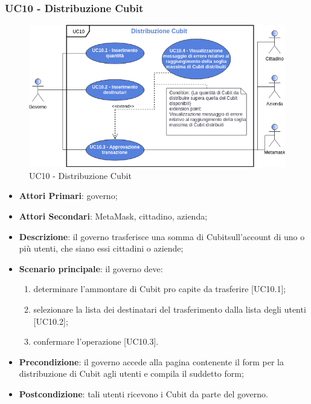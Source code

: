 \subsubsection{UC10 - Distribuzione Cubit}
\begin{figure}[h]
	\includegraphics[width=13.5cm]{res/images/UC10Distribuzione.png} %
	\centering
	\caption{UC10 - Distribuzione Cubit}
	
\end{figure}
\begin{itemize}
	\item \textbf{Attori Primari}: governo;
	\item \textbf{Attori Secondari}: MetaMask\glo, cittadino, azienda\glo;
	\item \textbf{Descrizione}: il governo trasferisce una somma di Cubit\glosp sull'account di uno o più  utenti, che siano essi cittadini o aziende;
	\item \textbf{Scenario principale}: il governo deve:
	 \begin{enumerate}[label=\alph*.]
		\item determinare l'ammontare di Cubit pro capite da trasferire [UC10.1];
		\item  selezionare la lista dei destinatari del trasferimento dalla lista degli utenti [UC10.2];
		\item confermare l'operazione [UC10.3].
	\end{enumerate}

	\item \textbf{Precondizione}: il governo accede alla pagina contenente il form per la distribuzione di Cubit agli utenti e compila il suddetto form;
	\item \textbf{Postcondizione}: tali utenti ricevono i Cubit da parte del governo.
\end{itemize}
